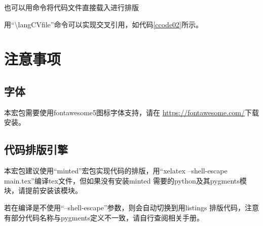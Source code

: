 \documentclass{ctexart}
\newcommand{\qtmark}[1]{``#1''}
\begin{document}
也可以用命令将代码文件直接载入进行排版

用\qtmark{\textbackslash langCVfile}命令可以实现交叉引用，如代码\ref{ccode02}所示。


\section{注意事项}
\subsection{字体}
本宏包需要使用fontawesome5图标字体支持，请在
\url{https://fontawesome.com/}下载安装。
\subsection{代码排版引擎}
本宏包建议使用\qtmark{minted}宏包实现代码的排版，用\qtmark{xelatex
  --shell-escape main.tex}编译tex文件，但如果没有安装minted
需要的python及其pygments模块，请提前安装该模块。

若在编译是不使用\qtmark{--shell-escape}参数，则会自动切换到用listings
排版代码，注意有部分代码名称与pygments定义不一致，请自行查阅相关手册。
\end{document}
